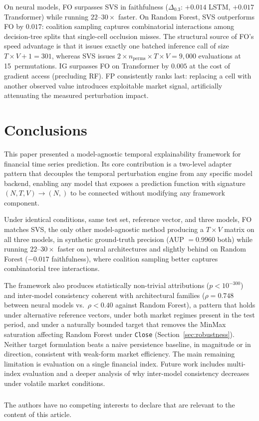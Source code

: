 \documentclass[runningheads]{llncs}
\begin{document}
On neural models, FO surpasses SVS in faithfulness ($\Delta_{0.3}$:
$+0.014$ LSTM, $+0.017$ Transformer) while running $22$--$30{\times}$
faster.
On Random Forest, SVS outperforms FO by $0.017$: coalition sampling
captures combinatorial interactions among decision-tree splits that
single-cell occlusion misses.
The structural source of FO's speed advantage is that it issues
exactly one batched inference call of size $T{\times}V{+}1{=}301$,
whereas SVS issues $2{\times}n_\text{perms}{\times}T{\times}V{=}9{,}000$
evaluations at 15~permutations.
IG surpasses FO on Transformer by $0.005$ at the cost of gradient
access (precluding RF).
FP consistently ranks last: replacing a cell with another observed
value introduces exploitable market signal, artificially attenuating
the measured perturbation impact.

\section{Conclusions}
\label{sec:conclusions}

This paper presented a model-agnostic temporal explainability
framework for financial time series prediction. Its core contribution
is a two-level adapter pattern that decouples the temporal perturbation
engine from any specific model backend, enabling any model that exposes
a prediction function with signature $(N, T, V) \rightarrow (N,)$ to
be connected without modifying any framework component.

Under identical conditions, same test set, reference vector, and
three models, FO matches SVS, the only other model-agnostic method
producing a $T{\times}V$ matrix on all three models, in synthetic
ground-truth precision (AUP $=0.9960$ both) while running
$22$--$30{\times}$ faster on neural architectures and slightly behind
on Random Forest ($-0.017$ faithfulness), where coalition sampling
better captures combinatorial tree interactions.

The framework also produces statistically non-trivial attributions
($p < 10^{-300}$) and inter-model consistency coherent with
architectural families ($\rho = 0.748$ between neural models vs.\
$\rho < 0.40$ against Random Forest), a pattern that holds under
alternative reference vectors, under both market regimes present in
the test period, and under a naturally bounded target that removes
the MinMax saturation affecting Random Forest under \texttt{Close}
(Section~\ref{sec:robustness}). Neither target formulation beats a
naive persistence baseline, in magnitude or in direction, consistent
with weak-form market efficiency. The main remaining limitation is
evaluation on a single financial index. Future work includes
multi-index evaluation and a deeper analysis of why inter-model
consistency decreases under volatile market conditions.

\begin{credits}
\subsubsection{\discintname}
The authors have no competing interests to declare that are
relevant to the content of this article.
\end{credits}



\end{document}
